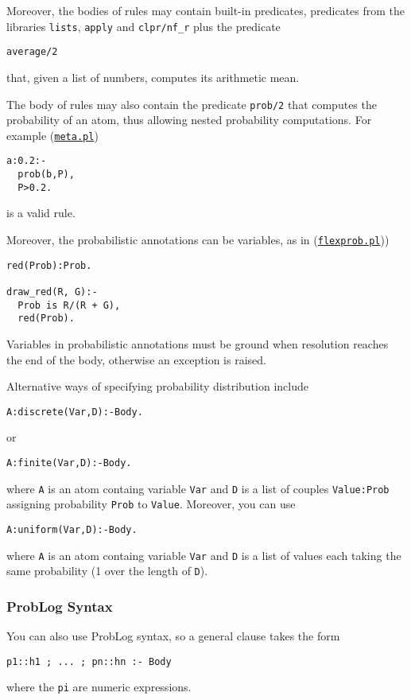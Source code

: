 Moreover, the bodies of rules may contain built-in predicates, predicates
from the libraries \verb|lists|, \verb|apply| and \verb|clpr/nf_r|
plus the predicate
\begin{verbatim}
average/2
\end{verbatim}
that, given a list of numbers, computes its arithmetic mean.

The body of rules may also contain the predicate \verb|prob/2| that computes the
probability of an atom, thus allowing nested probability computations.
For example (\href{http://cplint.eu/example/inference/meta.pl}{\texttt{meta.pl}})
\begin{verbatim}
a:0.2:-
  prob(b,P),
  P>0.2.
\end{verbatim}
is a valid rule.

Moreover, the probabilistic annotations can be variables, as in 
(\href{http://cplint.eu/example/inference/flexprob.pl}{\texttt{flexprob.pl}}))
\begin{verbatim}
red(Prob):Prob.

draw_red(R, G):-
  Prob is R/(R + G),
  red(Prob).
\end{verbatim}
Variables in probabilistic annotations must be ground when resolution reaches the end of the body, 
otherwise an exception is raised.

Alternative ways of specifying probability distribution include
\begin{verbatim}
A:discrete(Var,D):-Body.
\end{verbatim}
or
\begin{verbatim}
A:finite(Var,D):-Body.
\end{verbatim}
where \verb|A| is an atom containg variable \verb|Var| and \verb|D|
is a list of couples \verb|Value:Prob| assigning probability \verb|Prob|
to \verb|Value|. 
Moreover, you can use
\begin{verbatim}
A:uniform(Var,D):-Body.
\end{verbatim}
where \verb|A| is an atom containg variable \verb|Var| and \verb|D|
is a list of values each taking the same probability (1 over the length
of \verb|D|).
\subsubsection{ProbLog Syntax}
You can also use ProbLog \cite{DBLP:conf/ijcai/RaedtKT07} syntax, so a general clause takes the form
\begin{verbatim}
p1::h1 ; ... ; pn::hn :- Body
\end{verbatim}
where the \texttt{pi} are numeric expressions. 

